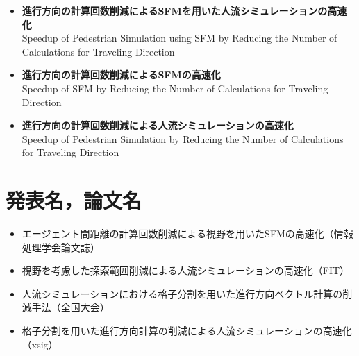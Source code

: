 \begin{itemize}
\item \textbf{進行方向の計算回数削減によるSFMを用いた人流シミュレーションの高速化}\\
        Speedup of Pedestrian Simulation using SFM by Reducing the Number of Calculations for Traveling Direction
\item \textbf{進行方向の計算回数削減によるSFMの高速化}\\
        Speedup of SFM by Reducing the Number of Calculations for Traveling Direction
\item \textbf{進行方向の計算回数削減による人流シミュレーションの高速化}\\
        Speedup of Pedestrian Simulation by Reducing the Number of Calculations for Traveling Direction
\end{itemize}


\section{発表名，論文名}

\begin{itemize}
\item エージェント間距離の計算回数削減による視野を用いたSFMの高速化（情報処理学会論文誌）
\item 視野を考慮した探索範囲削減による人流シミュレーションの高速化（FIT）
\item 人流シミュレーションにおける格子分割を用いた進行方向ベクトル計算の削減手法（全国大会）
\item 格子分割を用いた進行方向計算の削減による人流シミュレーションの高速化（xsig）
\end{itemize}

